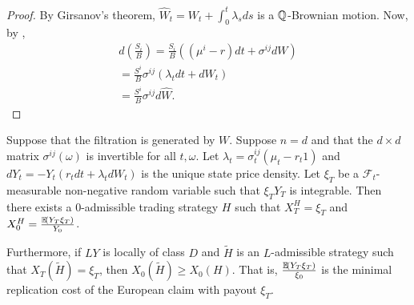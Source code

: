 \begin{proof}
  By Girsanov's theorem, $\hat W_{t} = W_{t} + \int_{0}^{t}
  \lambda_{s} ds$ is a $\Q$-Brownian motion.  Now, by \ito,
  \begin{align}
    \label{eq:77}
    d(\frac{S_{i}}{B}) = \frac{S_{i}}{B}((\mu^{i} - r) dt +
    \sigma^{ij} dW) \\
    = \frac{S^{i}}{B} \sigma^{ij} (\lambda_{t} dt + dW_{t}) \\
    = \frac{S^{i}}{B} \sigma^{ij} d \hat W.
  \end{align}
\end{proof}

\begin{thm}
  \label{defn:continuous_time:32}
  Suppose that the filtration is generated by $W$.  Suppose $n = d$
  and that the $d \times d$ matrix $\sigma^{ij}(\omega)$ is invertible
  for all $t, \omega$.  Let $\lambda_{t} = \sigma_{t}^{ij}(\mu_{t} -
  r_{t} 1)$ and $dY_{t} = -Y_{t}(r_{t} dt + \lambda_{t} dW_{t})$ is
  the unique state price density.  Let $\xi_{T}$ be a
  $\mathcal{F}_{t}$-measurable non-negative random variable such that
  $\xi_{T} Y_{T}$ is integrable.  Then there exists a $0$-admissible
  trading strategy $H$ such that $X_{T}^{H} = \xi_{T}$ and $X_{0}^{H}
  = \frac{\E{Y_{T} \xi_{T}}}{Y_{0}}$.

  Furthermore, if $LY$ is locally of class $D$ and $\tilde H$ is an
  $L$-admissible strategy such that $X_{T}(\tilde H) = \xi_{T}$, then
  $X_{0}(\tilde H) \geq X_{0}(H)$.  That is, $\frac{\E{Y_{T}
      \xi_{T}}}{\xi_{0}}$ is the minimal replication cost of the
  European claim with payout $\xi_{T}$.
\end{thm}

